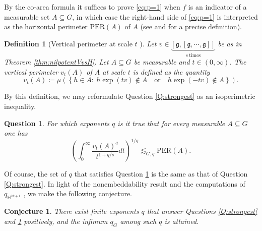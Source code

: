 \documentclass[11pt,reqno]{amsart}
\newtheorem{conjecture}[theorem]{Conjecture}
\newtheorem{question}[theorem]{Question}
\newtheorem{definition}[theorem]{Definition}
\newcommand{\1}{\mathbf 1}
\begin{document}
By the co-area formula it suffices to prove \eqref{eq:p=1} when $f$ is an indicator of a measurable set $A\subseteq G$, in which case the right-hand side of \eqref{eq:p=1} is interpreted as the horizontal perimeter $\mathrm{PER}\left(A\right)$ of $A$ (see \cite{ambrosio2001some} and \cite[Section 2]{cheeger2010differentiating} for a precise definition).

\begin{definition}[Vertical perimeter at scale $t$ \cite{lafforgue2014vertical,naor2018vertical}]\label{def vert}
Let $v\in \underbrace{\left[\mathfrak{g},\left[\mathfrak{g},\cdots,\mathfrak{g}\right]\right]}_{s~\mathrm{times}}$ be as in Theorem \ref{thm:nilpotentVvsH}. Let $A\subseteq G$ be measurable and $t\in \left(0,\infty\right)$. The vertical perimeter $v_t\left(A\right)$ of $A$ at scale $t$ is defined as the quantity
\begin{equation}\label{eq:def Vt}
v_t\left(A\right)\coloneqq \mu\left(\left\{h\in A:\ h\exp\left(tv\right)\notin A\quad\mathrm{or}\quad h\exp\left(-tv\right)\notin A\right\}\right).
\end{equation}
\end{definition}
By this definition, we may reformulate Question \ref{Q:strongest} as an isoperimetric inequality.
\begin{question}\label{Q:isoperimetric}
For which exponents $q$ is it true that for every measurable $A\subseteq G$ one has
\begin{equation}\label{eq:con isoperimetric}
\left(\int_0^\infty \frac{v_t\left(A\right)^q}{t^{1+q/s}}dt\right)^{1/q}\lesssim_{G,q} \mathrm{PER}\left(A\right).
\end{equation}
\end{question}

Of course, the set of $q$ that satisfies Question \ref{Q:isoperimetric} is the same as that of Question \ref{Q:strongest}. In light of the nonembeddability result \cite{eriksson2023nilpotent} and the computations of $q_{\mathbb{H}^{2k+1}}$ \cite{naor2018vertical,naor2022foliated}, we make the following conjecture.



\begin{conjecture}\label{conj:finite}
There exist finite exponents $q$ that answer Questions \ref{Q:strongest} and \ref{Q:isoperimetric} positively, and the infimum $q_G$ among such $q$ is attained.
\end{conjecture}
\end{document}
